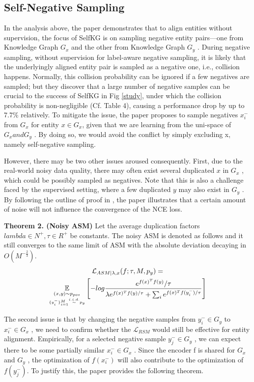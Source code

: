 \documentclass[sigconf]{acmart}
\begin{document}
{\subsection{Self-Negative Sampling} \label{3.3}
In the analysis above, the paper demonstrates that to align entities without supervision, the focus of SelfKG is on sampling negative entity pairs—one from Knowledge Graph $G_x$ and the other from Knowledge Graph $G_y$ . During negative sampling, without supervision for label-aware negative sampling, it is likely that the underlyingly aligned entity pair is sampled as a negative one, i.e., collision happens. Normally, this collision probability can be ignored if a few negatives are sampled; but they discover that a large number of negative samples can be crucial to the success of SelfKG in Fig \ref{study}, under which the collision probability is non-negligible (Cf. Table 4), causing a performance drop by up to 7.7\%  
relatively. To mitigate the issue, the paper proposes to sample negatives $x_i^{-}$ from $G_x$ for entity $x \in G_x $, given that we are learning from the uni-space of $G_x and G_y$ . By doing so, we would avoid the conflict by simply excluding x, namely self-negative sampling.

However, there may be two other issues aroused consequently. First, due to the real-world noisy data quality, there may often exist several duplicated $x$ in $G_x$ , which could be possibly sampled as negatives. Note that this is also a challenge faced by the supervised setting, where a few duplicated $y$ may also exist in $G_y$ . By following the outline of proof in \cite{gutmann2010noise}, the paper illustrates that a certain amount of noise will not influence the convergence of the NCE loss.

\textbf{Theorem 2. (Noisy ASM)} Let the average duplication factors $lambda \in N^{+}, \tau \in R^+$ be constants. The noisy ASM is denoted as follows and it still converges to the same limit of ASM with the absolute deviation decaying in $O(M^{-\frac{2}{3}})$.
\begin{gather}\label{2}
    \mathcal{L}_{ASM|\lambda ,x}(f;\tau,M,p_y) = \notag \\ \underset{\underset{\{y_i^-\}_{i=1}^M \overset{i.i.d.}{\sim}p_y}{(x,y) \sim p_{pos}}}{\mathbb{E} } \left [ -log\frac{e^{f(x)^Tf(y)}/\tau}{\lambda e^{f(x)^Tf(y)/\tau}+\sum _ie^{f(x)^Tf(y_i^-)/\tau }}  \right ] 
\end{gather}

The second issue is that by changing the negative samples from $y_i^- \in G_y$ to $x_i^- \in G_x$ , we need to confirm whether the $\mathcal{L}_{RSM}$ would still be effective for entity alignment. Empirically, for a selected negative sample $y_j^- \in G_y$ , we can expect there to be some partially similar $x_i^- \in G_x$ . Since the encoder f is shared for $G_x$ and $G_y$ , the optimization of $f (x_i^-)$ will also contribute to the optimization of $f(y_j^-)$. To justify this, the paper provides the following theorem.

}
\end{document}
